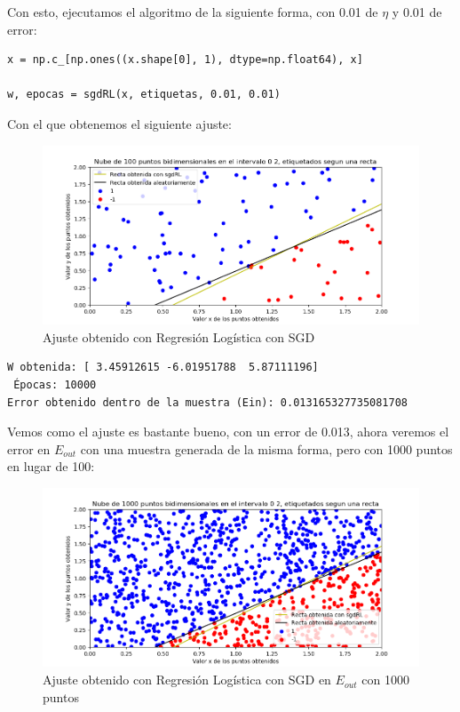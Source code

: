 \documentclass[12pt, spanish]{article}
\begin{document}
Con esto, ejecutamos el algoritmo de la siguiente forma, con 0.01 de $\eta$ y 0.01 de error:

\begin{lstlisting}
x = np.c_[np.ones((x.shape[0], 1), dtype=np.float64), x]

w, epocas = sgdRL(x, etiquetas, 0.01, 0.01)
\end{lstlisting}

Con el que obtenemos el siguiente ajuste:

\begin{figure}[H]
  \centering
      \includegraphics[scale = 0.70]{ej-2-SGR-RL.png}
 		 \caption{Ajuste obtenido con Regresión Logística con SGD}
  		\label{fig:ej2-SGR-RL}

\end{figure}

\begin{lstlisting}
W obtenida: [ 3.45912615 -6.01951788  5.87111196]
 Épocas: 10000
Error obtenido dentro de la muestra (Ein): 0.013165327735081708
\end{lstlisting}

Vemos como el ajuste es bastante bueno, con un error de 0.013, ahora veremos el error en $E_{out}$ con una muestra generada de la misma forma, pero con 1000 puntos en lugar de 100:

\begin{figure}[H]
  \centering
      \includegraphics[scale = 0.70]{ej-2-SGR-RL-1000.png}
 		 \caption{Ajuste obtenido con Regresión Logística con SGD en $E_{out}$ con 1000 puntos}
  		\label{fig:ej2-SGR-RL}

\end{figure}
\end{document}
